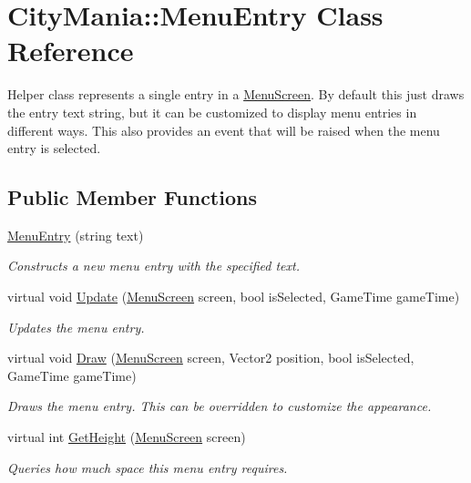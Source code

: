 \hypertarget{classCityMania_1_1MenuEntry}{
\section{CityMania::MenuEntry Class Reference}
\label{classCityMania_1_1MenuEntry}
}


Helper class represents a single entry in a \hyperlink{classCityMania_1_1MenuScreen}{MenuScreen}. By default this just draws the entry text string, but it can be customized to display menu entries in different ways. This also provides an event that will be raised when the menu entry is selected.  
\subsection*{Public Member Functions}
\begin{DoxyCompactItemize}
\item 
\hyperlink{classCityMania_1_1MenuEntry_a2767be7f86275b7d0063d938897bdc55}{MenuEntry} (string text)
\begin{DoxyCompactList}\small\item\em Constructs a new menu entry with the specified text. \item\end{DoxyCompactList}\item 
virtual void \hyperlink{classCityMania_1_1MenuEntry_a0e1a13e81f7c27a116122ca5d59b3858}{Update} (\hyperlink{classCityMania_1_1MenuScreen}{MenuScreen} screen, bool isSelected, GameTime gameTime)
\begin{DoxyCompactList}\small\item\em Updates the menu entry. \item\end{DoxyCompactList}\item 
virtual void \hyperlink{classCityMania_1_1MenuEntry_a967b77f88de3650229d320712349d3b0}{Draw} (\hyperlink{classCityMania_1_1MenuScreen}{MenuScreen} screen, Vector2 position, bool isSelected, GameTime gameTime)
\begin{DoxyCompactList}\small\item\em Draws the menu entry. This can be overridden to customize the appearance. \item\end{DoxyCompactList}\item 
virtual int \hyperlink{classCityMania_1_1MenuEntry_ac547564728d74c6e59747e57831a0d07}{GetHeight} (\hyperlink{classCityMania_1_1MenuScreen}{MenuScreen} screen)
\begin{DoxyCompactList}\small\item\em Queries how much space this menu entry requires. \item\end{DoxyCompactList}\end{DoxyCompactItemize}
